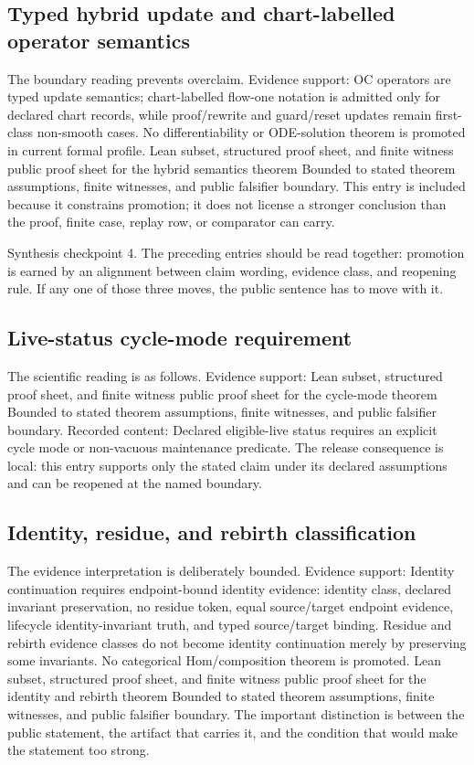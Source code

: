 \subsection{Typed hybrid update and chart-labelled operator semantics}
The boundary reading prevents overclaim. Evidence support: OC operators are typed update semantics; chart-labelled flow-one notation is admitted only for declared chart records, while proof/rewrite and guard/reset updates remain first-class non-smooth cases. No differentiability or ODE-solution theorem is promoted in current formal profile. Lean subset, structured proof sheet, and finite witness public proof sheet for the hybrid semantics theorem Bounded to stated theorem assumptions, finite witnesses, and public falsifier boundary. This entry is included because it constrains promotion; it does not license a stronger conclusion than the proof, finite case, replay row, or comparator can carry.

Synthesis checkpoint 4. The preceding entries should be read together: promotion is earned by an alignment between claim wording, evidence class, and reopening rule. If any one of those three moves, the public sentence has to move with it.

\subsection{Live-status cycle-mode requirement}
The scientific reading is as follows. Evidence support: Lean subset, structured proof sheet, and finite witness public proof sheet for the cycle-mode theorem Bounded to stated theorem assumptions, finite witnesses, and public falsifier boundary. Recorded content: Declared eligible-live status requires an explicit cycle mode or non-vacuous maintenance predicate. The release consequence is local: this entry supports only the stated claim under its declared assumptions and can be reopened at the named boundary.

\subsection{Identity, residue, and rebirth classification}
The evidence interpretation is deliberately bounded. Evidence support: Identity continuation requires endpoint-bound identity evidence: identity class, declared invariant preservation, no residue token, equal source/target endpoint evidence, lifecycle identity-invariant truth, and typed source/target binding. Residue and rebirth evidence classes do not become identity continuation merely by preserving some invariants. No categorical Hom/composition theorem is promoted. Lean subset, structured proof sheet, and finite witness public proof sheet for the identity and rebirth theorem Bounded to stated theorem assumptions, finite witnesses, and public falsifier boundary. The important distinction is between the public statement, the artifact that carries it, and the condition that would make the statement too strong.

